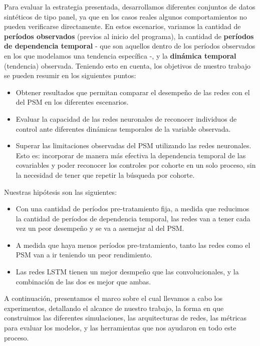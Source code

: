 \documentclass[../main.tex]{subfiles}
\begin{document}
Para evaluar la estrategia presentada, desarrollamos diferentes conjuntos de datos
sintéticos de tipo panel\footnotemark, ya que en los casos reales algunos comportamientos
no pueden verificarse directamente. En estos escenarios, variamos la cantidad de
\textbf{períodos observados} (previos al inicio del programa), la cantidad de
\textbf{períodos de dependencia temporal} - que son aquellos dentro de los períodos
observados en los que modelamos una tendencia específica -, y la \textbf{dinámica
temporal} (tendencia) observada. Teniendo esto en cuenta, los objetivos de nuestro trabajo
se pueden resumir en los siguientes puntos: 
\begin{itemize}
    \item Obtener resultados que permitan comparar el desempeño de las redes con
    el del PSM en los diferentes escenarios.
    \item Evaluar la capacidad de las redes neuronales de reconocer individuos de control
    ante diferentes dinámicas temporales de la variable observada.
    \item Superar las limitaciones observadas del PSM utilizando las redes neuronales.
    Esto es: incorporar de manera más efectiva la dependencia temporal de las covariables
    y poder reconocer los controles por cohorte en un solo proceso, sin la necesidad de
    tener que repetir la búsqueda por cohorte.
\end{itemize}

Nuestras hipótesis son las siguientes:
\begin{itemize}
    \item Con una cantidad de períodos pre-tratamiento fija, a medida que reducimos
    la cantidad de períodos de dependencia temporal, las redes van a tener cada
    vez un peor desempeño y se va a asemejar al del PSM.
    \item A medida que haya menos períodos pre-tratamiento, tanto las redes como el
    PSM van a ir teniendo un peor rendimiento.
    \item Las redes LSTM tienen un mejor desmpeño que las convolucionales, y la combinación
    de las dos es mejor que ambas.
\end{itemize}

A continuación, presentamos el marco sobre el cual llevamos a cabo los experimentos,
detallando el alcance de nuestro trabajo, la forma en que construimos las diferentes
simulaciones, las arquitecturas de redes, las métricas para evaluar los modelos,
y las herramientas que nos ayudaron en todo este proceso.
\end{document}
